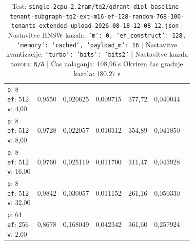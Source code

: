 \begin{table}[htbp]
\begin{tabularx}{\textwidth}{Xrrrrrr}
    \makecell{\texttt{p}: 8\\\texttt{ef}: 512\\\texttt{v}: 4,00} & 0,9550 & 0,020625 & 0,009715 & 377,72 & 0,040044 \\
    \makecell{\texttt{p}: 8\\\texttt{ef}: 512\\\texttt{v}: 8,00} & 0,9728 & 0,022057 & 0,010312 & 354,89 & 0,041850 \\
    \makecell{\texttt{p}: 8\\\texttt{ef}: 512\\\texttt{v}: 16,00} & 0,9760 & 0,025119 & 0,011700 & 311,47 & 0,043928 \\
    \makecell{\texttt{p}: 8\\\texttt{ef}: 512\\\texttt{v}: 32,00} & 0,9842 & 0,030057 & 0,011152 & 261,16 & 0,050330 \\
    \makecell{\texttt{p}: 64\\\texttt{ef}: 256\\\texttt{v}: 2,00} & 0,8678 & 0,168049 & 0,042342 & 361,60 & 0,257924 \\
    \bottomrule
  \end{tabularx}
\caption* {Test: \texttt{single-2cpu-2.2ram/tq2/qdrant-dipl-baseline-tenant-subgraph-tq2-ext-m16-ef-128-random-768-100-tenants-extended-upload-2026-08-18-12-08-12.json} | Nastavitve HNSW kazala: \texttt{{'m': 0, 'ef\_construct': 128, 'memory': 'cached', 'payload\_m': 16}} | Nastavitve kvantizacije: \texttt{{'turbo': {'bits': 'bits2'}}} | Nastavitve kazala tovora: \texttt{N/A} | Čas nalaganja: 108,96 s Okviren čas gradnje kazala: 180,27 s}\end{table}



